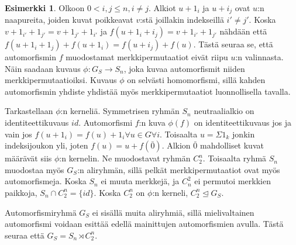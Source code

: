 \documentclass[a4paper, 12pt]{article}
\theoremstyle{definition}
\newtheorem{example}[mydef]{Esimerkki}
\theoremstyle{plain}
\begin{document}
\begin{example}
Olkoon $0 < i, j \leq n, i \neq j$. Alkiot $u + 1_i$ ja $u+ i_j$ ovat $u$:n naapureita, joiden kuvat poikkeavat $v$:stä joillakin indekseillä $i' \neq j'$. Koska $v + 1_{i'} + 1_{j'} = v + 1_{j'} + 1_{i'}$ ja $f(u + 1_i + i_j) = v + 1_{i'} + 1_{j'}$ nähdään että $f(u + 1_i + 1_j) + f(u + 1_i) = f(u + i_j) + f(u)$. Tästä seuraa se, että automorfismin $f$ muodostamat merkkipermutaatiot eivät riipu $u$:n valinnasta. Näin saadaan kuvaus ${\phi: G_S \rightarrow S_n}$, joka kuvaa automorfismit niiden merkkipermutaatioiksi. Kuvaus $\phi$ on selvästi homomorfismi, sillä kahden automorfismin yhdiste yhdistää myös merkkipermutaatiot luonnollisella tavalla.

Tarkastellaan $\phi$:n kerneliä. Symmetrisen ryhmän $S_n$ neutraalialkio on identiteettikuvaus $id$. Automorfismi $f$:n kuva $\phi(f)$ on identiteettikuvaus jos ja vain jos $f(u + 1_i) = f(u) + 1_i \forall u \in G \forall i$. Toisaalta $u = \Sigma 1_k$ jonkin indeksijoukon yli, joten $f(u) = u + f(\bar{0})$. Alkion $\bar{0}$ mahdolliset kuvat määrävät siis $\phi$:n kernelin. Ne muodostavat ryhmän $C_2^n$. Toisaalta ryhmä $S_n$ muodostaa myös $G_S$:n aliryhmän, sillä pelkät merkkipermutaatiot ovat myös automorfismeja. Koska $S_n$ ei muuta merkkejä, ja $C_n^2$ ei permutoi merkkien paikkoja, $S_n \cap C_2^n = \{ id \}$. Koska $C_2^n$ on $\phi$:n kerneli, $C_2^n \trianglelefteq G_S$.

Automorfismiryhmä $G_S$ ei sisällä muita aliryhmiä, sillä mielivaltainen automorfismi voidaan esittää edellä mainittujen automorfismien avulla. Tästä seuraa että $G_S = S_n \rtimes C_2^n$.
\end{example}
\end{document}

